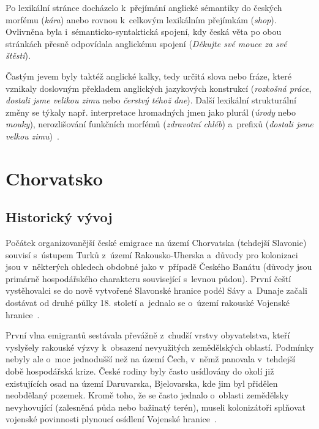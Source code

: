 Po lexikální stránce docházelo k~přejímání anglické sémantiky do českých morfému (\emph{kára}) anebo rovnou k~celkovým lexikálním přejímkám (\emph{shop}). Ovlivněna byla i~sémanticko-syntaktická spojení, kdy česká věta po obou stránkách přesně odpovídala anglickému spojení (\emph{Děkujte své mouce za své štěstí}).

Častým jevem byly taktéž anglické kalky, tedy určitá slova nebo fráze, které vznikaly doslovným překladem anglických jazykových konstrukcí (\emph{rozkošná práce}, \emph{dostali jsme velikou zimu} nebo \emph{čerstvý téhož dne}). Další lexikální strukturální změny se týkaly např. interpretace hromadných jmen jako plurál (\emph{úrody} nebo \emph{mouky}), nerozlišování funkčních morfémů (\emph{zdravotní chléb}) a~prefixů (\emph{dostali jsme velkou zimu})~\parencite{amerika2017}.

\hypertarget{chorvatsko}{%
\section{Chorvatsko}\label{chorvatsko}}

\hypertarget{historickuxfd-vuxfdvoj-3}{%
\subsection*{Historický vývoj}\label{historickuxfd-vuxfdvoj-3}}

Počátek organizovanější české emigrace na území Chorvatska (tehdejší Slavonie) souvisí s~ústupem Turků z~území Rakousko-Uherska a~důvody pro kolonizaci jsou v~některých ohledech obdobné jako v~případě Českého Banátu (důvody jsou primárně hospodářského charakteru související s~levnou půdou). První čeští vystěhovalci se do nově vytvořené Slavonské hranice podél Sávy a~Dunaje začali dostávat od druhé půlky 18. století a~jednalo se o~území rakouské Vojenské hranice~\parencite{Preissova2020}.

První vlna emigrantů sestávala převážně z~chudší vrstvy obyvatelstva, kteří vyslyšely rakouské výzvy k~obsazení nevyužitých zemědělských oblastí. Podmínky nebyly ale o~moc jednodušší než na území Čech, v~němž panovala v~tehdejší době hospodářská krize. České rodiny byly často usídlovány do okolí již existujících osad na území Daruvarska, Bjelovarska, kde jim byl přidělen neobdělaný pozemek. Kromě toho, že se často jednalo o~oblasti zemědělsky nevyhovující (zalesněná půda nebo bažinatý terén), museli kolonizátoři splňovat vojenské povinnosti plynoucí osídlení Vojenské hranice~\parencite{Stranjik2017}.

